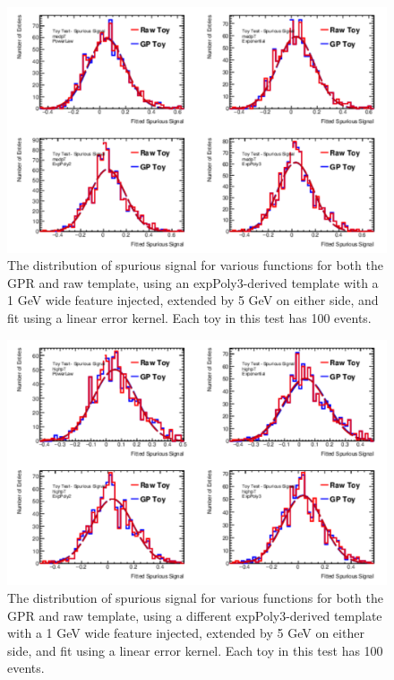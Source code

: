 \begin{figure} 
\begin{center}
  \includegraphics[width=\textwidth]{figures/background/gpr/validation/linear/ToyTest_FitSigVals_medpT_100_Sig_1s}   
\caption{The distribution of spurious signal for various functions for both the GPR and raw template, using an expPoly3-derived template with a 1 GeV wide feature injected, extended by 5 GeV on either side, and fit using a linear error kernel. Each toy in this test has 100 events.}
\label{fig:linearkernel_medpt_100_Sig_1s}
\end{center}
\end{figure}

\begin{figure} 
\begin{center}
  \includegraphics[width=\textwidth]{figures/background/gpr/validation/linear/ToyTest_FitSigVals_highpT_100_Sig_1s}   
\caption{The distribution of spurious signal for various functions for both the GPR and raw template, using a different expPoly3-derived template with a 1 GeV wide feature injected, extended by 5 GeV on either side, and fit using a linear error kernel. Each toy in this test has 100 events.}
\label{fig:linearkernel_highpt_100_Sig_1s}
\end{center}
\end{figure}

